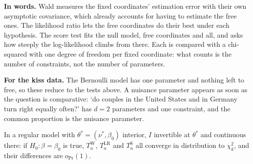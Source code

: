 \begin{inwords}
\textbf{In words.} Wald measures the fixed coordinates' estimation error with their own asymptotic covariance, which already accounts for having to estimate the free ones. The likelihood ratio lets the free coordinates do their best under each hypothesis. The score test fits the null model, free coordinates and all, and asks how steeply the log-likelihood climbs from there. Each is compared with a chi-squared with one degree of freedom per fixed coordinate: what counts is the number of constraints, not the number of parameters.
\par\smallskip
\textbf{For the kiss data.} The Bernoulli model has one parameter and nothing left to free, so these reduce to the tests above. A nuisance parameter appears as soon as the question is comparative: `do couples in the United States and in Germany turn right equally often?' has $d = 2$ parameters and one constraint, and the common proportion is the nuisance parameter.
\end{inwords}

\begin{theorem}
\label{thm:three-nuisance}
In a regular model with $\theta^* = (\nu^*, \beta_0)$ interior, $I$ invertible at $\theta^*$ and continuous there: if $H_0: \beta = \beta_0$ is true, $T^{\mathrm{W}}_n$, $T^{\mathrm{LR}}_n$ and $T^{\mathrm{S}}_n$ all converge in distribution to $\chi^2_k$, and their differences are $o_\Pr(1)$.
\end{theorem}

